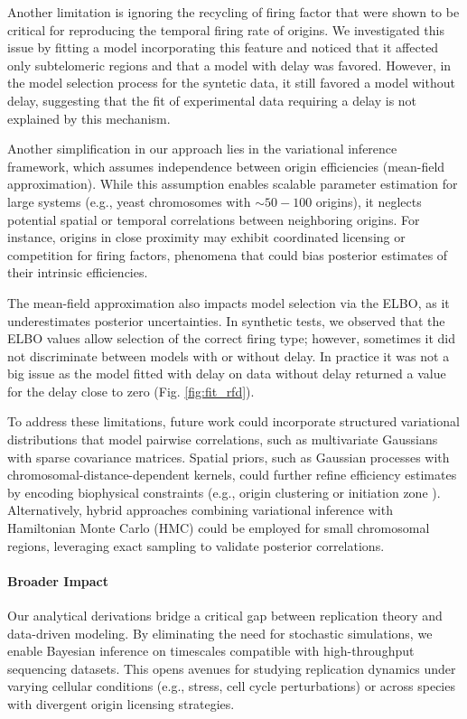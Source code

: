 \documentclass[10pt,a4paper]{revtex4-2}
\begin{document}
Another limitation is ignoring the recycling of firing factor that were shown to be critical 
for reproducing the temporal firing rate of origins. 
We investigated this issue by fitting a model incorporating this feature and noticed 
that it affected only subtelomeric regions and that a model with delay was favored. 
However, in the model selection process for the syntetic data, it still favored a model without delay, 
suggesting that the fit of experimental data requiring a delay is not explained by this mechanism.

Another simplification in our approach lies in the variational inference framework, which assumes independence between origin efficiencies (mean-field approximation). While this assumption enables scalable parameter estimation for large systems (e.g., yeast chromosomes with $\sim50-100$ origins), it neglects potential spatial or temporal correlations between neighboring origins. For instance, origins in close proximity may exhibit coordinated licensing or competition for firing factors, phenomena that could bias posterior estimates of their intrinsic efficiencies.

The mean-field approximation also impacts model selection via the ELBO, 
as it underestimates posterior uncertainties. 
In synthetic tests, we observed that the ELBO values allow selection of the correct firing type; 
however, sometimes it did not discriminate between models with or without delay. 
In practice it was not a big issue as the model fitted with delay on data without delay returned a value for the delay close to zero (Fig. \ref{fig:fit_rfd}).

To address these limitations, future work could incorporate structured variational distributions that model pairwise correlations,
 such as multivariate Gaussians with sparse covariance matrices. 
 Spatial priors, such as Gaussian processes with chromosomal-distance-dependent kernels, 
 could further refine efficiency estimates by encoding biophysical constraints (e.g., origin clustering or initiation zone \cite{Petryk2016}). 
 Alternatively, hybrid approaches combining variational inference with Hamiltonian Monte Carlo (HMC) could be employed for small chromosomal regions,
leveraging exact sampling to validate posterior correlations.


\paragraph{Broader Impact}

Our analytical derivations bridge a critical gap between replication theory and data-driven modeling. 
By eliminating the need for stochastic simulations, we enable Bayesian inference on timescales compatible 
with high-throughput sequencing datasets. This opens avenues for studying replication dynamics under varying 
cellular conditions (e.g., stress, cell cycle perturbations) or across species with divergent origin licensing strategies.
\end{document}
